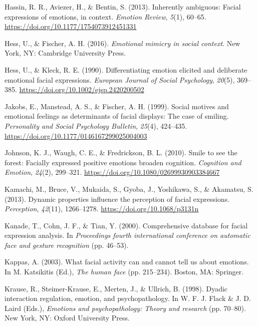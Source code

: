 \documentclass[
  english,
  doc]{apa7}
\newlength{\cslhangindent}
\newenvironment{cslreferences}%
  {\setlength{\parindent}{0pt}%
  \everypar{\setlength{\hangindent}{\cslhangindent}}\ignorespaces}%
  {\par}
\begin{document}
\begin{cslreferences}
\leavevmode\hypertarget{ref-hassin2013inherently}{}%
Hassin, R. R., Aviezer, H., \& Bentin, S. (2013). Inherently ambiguous: Facial expressions of emotions, in context. \emph{Emotion Review}, \emph{5}(1), 60--65. \url{https://doi.org/10.1177/1754073912451331}

\leavevmode\hypertarget{ref-hess2016emotional}{}%
Hess, U., \& Fischer, A. H. (2016). \emph{Emotional mimicry in social context}. New York, NY: Cambridge University Press.

\leavevmode\hypertarget{ref-hess1990differentiating}{}%
Hess, U., \& Kleck, R. E. (1990). Differentiating emotion elicited and deliberate emotional facial expressions. \emph{European Journal of Social Psychology}, \emph{20}(5), 369--385. \url{https://doi.org/10.1002/ejsp.2420200502}

\leavevmode\hypertarget{ref-jakobs1999social}{}%
Jakobs, E., Manstead, A. S., \& Fischer, A. H. (1999). Social motives and emotional feelings as determinants of facial displays: The case of smiling. \emph{Personality and Social Psychology Bulletin}, \emph{25}(4), 424--435. \url{https://doi.org/10.1177/0146167299025004003}

\leavevmode\hypertarget{ref-johnson2010smile}{}%
Johnson, K. J., Waugh, C. E., \& Fredrickson, B. L. (2010). Smile to see the forest: Facially expressed positive emotions broaden cognition. \emph{Cognition and Emotion}, \emph{24}(2), 299--321. \url{https://doi.org/10.1080/02699930903384667}

\leavevmode\hypertarget{ref-kamachi2013dynamic}{}%
Kamachi, M., Bruce, V., Mukaida, S., Gyoba, J., Yoshikawa, S., \& Akamatsu, S. (2013). Dynamic properties influence the perception of facial expressions. \emph{Perception}, \emph{42}(11), 1266--1278. \url{https://doi.org/10.1068/p3131n}

\leavevmode\hypertarget{ref-kanade2000comprehensive}{}%
Kanade, T., Cohn, J. F., \& Tian, Y. (2000). Comprehensive database for facial expression analysis. In \emph{Proceedings fourth international conference on automatic face and gesture recognition} (pp. 46--53).

\leavevmode\hypertarget{ref-kappas2003facial}{}%
Kappas, A. (2003). What facial activity can and cannot tell us about emotions. In M. Katsikitis (Ed.), \emph{The human face} (pp. 215--234). Boston, MA: Springer.

\leavevmode\hypertarget{ref-krause1998dyadic}{}%
Krause, R., Steimer-Krause, E., Merten, J., \& Ullrich, B. (1998). Dyadic interaction regulation, emotion, and psychopathology. In W. F. J. Flack \& J. D. Laird (Eds.), \emph{Emotions and psychopathology: Theory and research} (pp. 70--80). New York, NY: Oxford University Press.


\end{cslreferences}
\end{document}

